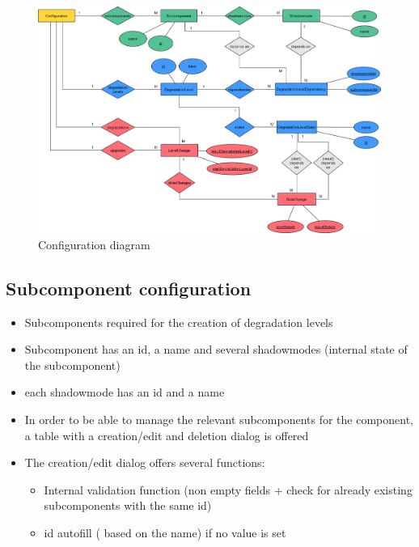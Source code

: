\begin{figure}[ht]
    \centering
    \includegraphics[width=\textwidth]{img/configuration_diagramm.png}
    \caption{Configuration diagram}
    \label{fig:configuration_diagram}
\end{figure}

\subsection{Subcomponent configuration}
\begin{itemize}
    \item Subcomponents required for the creation of degradation levels
    \item Subcomponent has an id, a name and several shadowmodes (internal state of the subcomponent)
    \item each shadowmode has an id and a name 
    \item In order to be able to manage the relevant subcomponents for the component, a table with a creation/edit and deletion dialog is offered
    \item The creation/edit dialog offers several functions: 
        \begin{itemize}
            \item Internal validation function (non empty fields + check for already existing subcomponents with the same id)
            \item id autofill ( based on the name) if no value is set
        \end{itemize}
\end{itemize}

